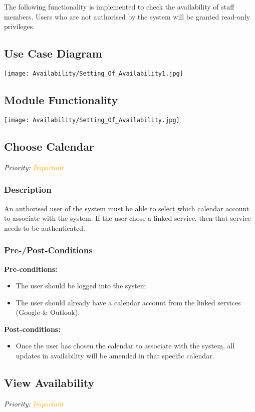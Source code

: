 The following functionality is implemented to check the availability of staff members. Users who are not authorised by the system will be granted read-only privileges.
\subsection{Use Case Diagram}
\texttt{[image: Availability/Setting\_Of\_Availability1.jpg]}

\subsection{Module Functionality}
\texttt{[image: Availability/Setting\_Of\_Availability.jpg]}

\subsection{Choose Calendar}
\textit{Priority: \textcolor{orange}{Important}}
	\subsubsection{Description}
	An authorised user of the system must be able to select which calendar account to associate with the system. If the user chose a linked service, then that service needs to be authenticated.
	\subsubsection{Pre-/Post-Conditions}
		\textbf{Pre-conditions:} 
			\begin{itemize}
				\item The user should be logged into the system 
				\item The user should already have a calendar account from the linked services (Google \& Outlook).
			\end{itemize}
		\textbf{Post-conditions:} 
			\begin{itemize}
				\item Once the user has chosen the calendar to associate with the system, all updates in availability will be amended in that specific calendar.
			\end{itemize}

\subsection{View Availability}
\textit{Priority: \textcolor{orange}{Important}}
